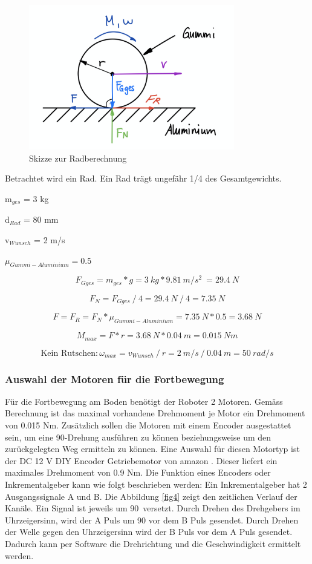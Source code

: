 \begin{figure}[H]
  \includegraphics[width=0.8\textwidth]{img/Fortbewegung/Radberechnung.png}
  \centering
  \caption{Skizze zur Radberechnung}
\end{figure}

\newpage

Betrachtet wird ein Rad. Ein Rad trägt ungefähr 1/4 des Gesamtgewichts.

m$_{ges}$ = 3 kg

d$_{Rad}$ = 80 mm

v$_{Wunsch}$ = 2 m/s

\( \mu_{Gummi-Aluminium} = 0.5\)

\[F_{Gges} = m_{ges} * g = 3\ kg * 9.81\ m/s^2\ = 29.4\ N \]

\[F_N = F_{Gges}\ /\ 4 = 29.4\ N\ /\ 4 = 7.35\ N \]

\[F = F_R = F_N * {\mu_{Gummi-Aluminium}} = 7.35\ N * 0.5 = 3.68\ N\]

\[M_{max} = F * r = 3.68\ N * 0.04\ m = 0.015\ Nm\]

\[\text{Kein Rutschen}: \omega_{max} = v_{Wunsch}\ /\ r = 2\ m/s\ /\ 0.04\ m = 50\ rad/s\]


\subsubsection{Auswahl der Motoren für die Fortbewegung}
Für die Fortbewegung am Boden benötigt der Roboter 2 Motoren. Gemäss Berechnung ist das maximal vorhandene Drehmoment je Motor ein Drehmoment von 0.015 Nm. Zusätzlich sollen die Motoren mit einem Encoder ausgestattet sein, um eine 90\textdegree-Drehung ausführen zu können beziehungsweise um den zurückgelegten Weg ermitteln zu können. Eine Auswahl für diesen Motortyp ist der DC 12 V DIY Encoder Getriebemotor von amazon \cite{MotorEncoder}. Dieser liefert ein maximales Drehmoment von 0.9 Nm. 
Die Funktion eines Encoders oder Inkrementalgeber kann wie folgt beschrieben werden: Ein Inkrementalgeber hat 2 Ausgangssignale \glqq A\grqq{} und \glqq B\grqq{}. Die Abbildung \ref{fig4} zeigt den zeitlichen Verlauf der Kanäle. Ein Signal ist jeweils um 90\textdegree\ versetzt. Durch Drehen des Drehgebers im Uhrzeigersinn, wird der \glqq A\grqq{} Puls um 90\textdegree{} vor dem \glqq B\grqq{} Puls gesendet. Durch Drehen der Welle gegen den Uhrzeigersinn wird der \glqq B\grqq{} Puls vor dem \glqq A\grqq{} Puls gesendet. Dadurch kann per Software die Drehrichtung und die Geschwindigkeit ermittelt werden.

